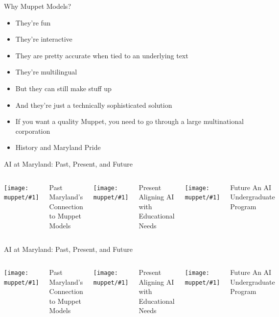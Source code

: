 \documentclass[compress]{beamer}
\newcommand{\fsi}[2]{
\begin{frame}[plain]
\vspace*{-1pt}
\makebox[\linewidth]{\texttt{[image: \#1]}}
\begin{center}
#2
\end{center}
\end{frame}
}
\newcommand{\gfxm}[2]{
	\begin{center}
		\texttt{[image: muppet/\#1]}
	\end{center}
}
\begin{document}
\begin{frame}{Why Muppet Models?}
\begin{itemize}
\item They’re fun
\item They’re interactive
  \item They are pretty accurate when tied to an underlying text
\item They’re multilingual
\item But they can still make stuff up
\item And they’re just a technically sophisticated solution
\item If you want a quality Muppet, you need to go through a large multinational corporation
  \pause
\item History and Maryland Pride
\end{itemize}
\end{frame}

\fsi{muppet/umd_1}{}
\fsi{muppet/umd_2}{}



\begin{frame}{AI at Maryland: Past, Present, and Future}

  \begin{columns}
\gfxm{mc_past}{1.0}
\begin{block}{Past}
        Maryland's Connection to Muppet Models
        \end{block}
\gfxm{mc_present}{1.0}
\begin{block}{Present}
        Aligning AI with Educational Needs
        \end{block}
\gfxm{mc_future}{1.0}  
\begin{block}{\alert<2>{Future}}
            An AI Undergraduate Program
        \end{block}
  \end{columns}

\end{frame}


\begin{frame}{AI at Maryland: Past, Present, and Future}

  \begin{columns}
\gfxm{mc_past}{1.0}
\begin{block}{Past}
        Maryland's Connection to Muppet Models
        \end{block}
\gfxm{mc_present}{1.0}
\begin{block}{\alert<2>{Present}}
        Aligning AI with Educational Needs
        \end{block}
\gfxm{mc_future}{1.0}  
\begin{block}{Future}
            An AI Undergraduate Program
        \end{block}
  \end{columns}

\end{frame}
\end{document}
